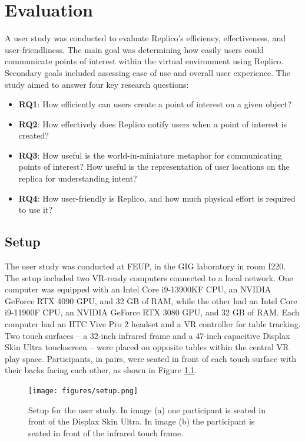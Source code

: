 \chapter{Evaluation}\label{chap:eval}

A user study was conducted to evaluate Replico's efficiency, effectiveness, and user-friendliness. The main goal was determining how easily users could communicate points of interest within the virtual environment using Replico. Secondary goals included assessing ease of use and overall user experience. The study aimed to answer four key research questions:

\begin{itemize}
    \item \textbf{RQ1}: How efficiently can users create a point of interest on a given object?
    \item \textbf{RQ2}: How effectively does Replico notify users when a point of interest is created?
    \item \textbf{RQ3}: How useful is the world-in-miniature metaphor for communicating points of interest? How useful is the representation of user locations on the replica for understanding intent? 
    \item \textbf{RQ4}: How user-friendly is Replico, and how much physical effort is required to use it? 
\end{itemize}

\section{Setup}

    The user study was conducted at FEUP, in the GIG laboratory in room I220. The setup included two VR-ready computers connected to a local network. One computer was equipped with an Intel Core i9-13900KF CPU, an NVIDIA GeForce RTX 4090 GPU, and 32 GB of RAM, while the other had an Intel Core i9-11900F CPU, an NVIDIA GeForce RTX 3080 GPU, and 32 GB of RAM. Each computer had an HTC Vive Pro 2 headset and a VR controller for table tracking. Two touch surfaces -- a 32-inch infrared frame and a 47-inch capacitive Displax Skin Ultra touchscreen -- were placed on opposite tables within the central VR play space. Participants, in pairs, were seated in front of each touch surface with their backs facing each other, as shown in Figure \ref{fig:eval_setup}.

    \begin{figure}[h]
        \centering
        \texttt{[image: figures/setup.png]}
        \caption{Setup for the user study. In image (a) one participant is seated in front of the Displax Skin Ultra. In image (b) the participant is seated in front of the infrared touch frame.}
        \label{fig:eval_setup}
    \end{figure}

